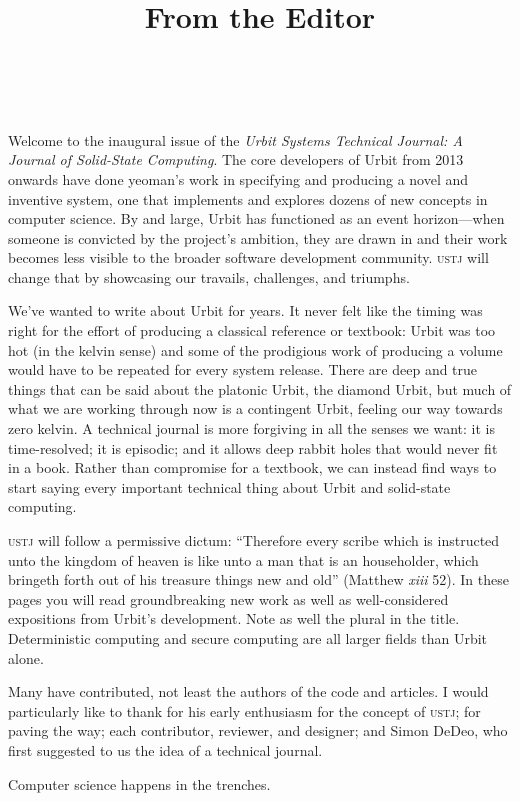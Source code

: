 \documentclass[twoside]{article}
\title{From the Editor}
\author{\authorname~\authorpatp \\ \affiliation}
\date{}
\begin{document}
\thispagestyle{firststyle}

\setcounter{page}{1}

Welcome to the inaugural issue of the \emph{Urbit Systems Technical Journal:  A Journal of Solid-State Computing}.  The core developers of Urbit from 2013 onwards have done yeoman's work in specifying and producing a novel and inventive system, one that implements and explores dozens of new concepts in computer science.  By and large, Urbit has functioned as an event horizon—when someone is convicted by the project's ambition, they are drawn in and their work becomes less visible to the broader software development community.  \textsc{ustj} will change that by showcasing our travails, challenges, and triumphs.

We've wanted to write about Urbit for years.  It never felt like the timing was right for the effort of producing a classical reference or textbook:  Urbit was too hot (in the kelvin sense) and some of the prodigious work of producing a volume would have to be repeated for every system release.  There are deep and true things that can be said about the platonic Urbit, the diamond Urbit, but much of what we are working through now is a contingent Urbit, feeling our way towards zero kelvin.  A technical journal is more forgiving in all the senses we want:  it is time-resolved; it is episodic; and it allows deep rabbit holes that would never fit in a book.  Rather than compromise for a textbook, we can instead find ways to start saying every important technical thing about Urbit and solid-state computing.

\textsc{ustj} will follow a permissive dictum:  “Therefore every scribe which is instructed unto the kingdom of heaven is like unto a man that is an householder, which bringeth forth out of his treasure things new and old” (Matthew \emph{xiii} 52).  In these pages you will read groundbreaking new work as well as well-considered expositions from Urbit's development.  Note as well the plural in the title.  Deterministic computing and secure computing are all larger fields than Urbit alone.

Many have contributed, not least the authors of the code and articles.  I would particularly like to thank  for his early enthusiasm for the concept of \textsc{ustj};  for paving the way; each contributor, reviewer, and designer; and Simon DeDeo, who first suggested to us the idea of a technical journal.

Computer science happens in the trenches.  \tombstone{}
\end{document}

